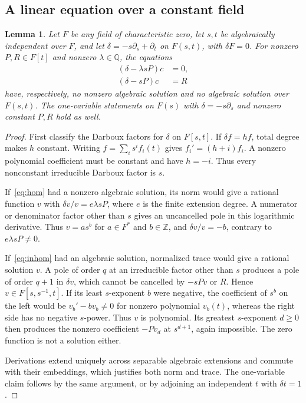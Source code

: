 \documentclass[11pt]{article}
\newtheorem{lemma}[theorem]{Lemma}
\theoremstyle{remark}\newtheorem{remark}[theorem]{Remark}
\newcommand{\Q}{\mathbb Q}
\begin{document}
\subsection{A linear equation over a constant field}
\begin{lemma}\label{lem:obstruction}
Let $F$ be any field of characteristic zero, let $s,t$ be algebraically independent over $F$, and let $\delta=-s\partial_s+\partial_t$ on $F(s,t)$, with $\delta F=0$. For nonzero $P,R\in F[t]$ and nonzero $\lambda\in\Q$, the equations
\begin{align}
 (\delta-\lambda sP)c&=0,\label{eq:hom}\\
 (\delta-sP)c&=R\label{eq:inhom}
\end{align}
have, respectively, no nonzero algebraic solution and no algebraic solution over $F(s,t)$. The one-variable statements on $F(s)$ with $\delta=-s\partial_s$ and nonzero constant $P,R$ hold as well.
\end{lemma}
\begin{proof}
First classify the Darboux factors for $\delta$ on $F[s,t]$. If $\delta f=hf$, total degree makes $h$ constant. Writing $f=\sum_i s^if_i(t)$ gives $f_i'=(h+i)f_i$. A nonzero polynomial coefficient must be constant and have $h=-i$. Thus every nonconstant irreducible Darboux factor is $s$.

If~\eqref{eq:hom} had a nonzero algebraic solution, its norm would give a rational function $v$ with $\delta v/v=e\lambda sP$, where $e$ is the finite extension degree. A numerator or denominator factor other than $s$ gives an uncancelled pole in this logarithmic derivative. Thus $v=a s^b$ for $a\in F^*$ and $b\in\mathbb Z$, and $\delta v/v=-b$, contrary to $e\lambda sP\ne0$.

If~\eqref{eq:inhom} had an algebraic solution, normalized trace would give a rational solution $v$. A pole of order $q$ at an irreducible factor other than $s$ produces a pole of order $q+1$ in $\delta v$, which cannot be cancelled by $-sPv$ or $R$. Hence $v\in F[s,s^{-1},t]$. If its least $s$-exponent $b$ were negative, the coefficient of $s^b$ on the left would be $v_b'-b v_b\ne0$ for nonzero polynomial $v_b(t)$, whereas the right side has no negative $s$-power. Thus $v$ is polynomial. Its greatest $s$-exponent $d\geq0$ then produces the nonzero coefficient $-Pv_d$ at $s^{d+1}$, again impossible. The zero function is not a solution either.

Derivations extend uniquely across separable algebraic extensions and commute with their embeddings, which justifies both norm and trace. The one-variable claim follows by the same argument, or by adjoining an independent $t$ with $\delta t=1$.
\end{proof}
\end{document}
